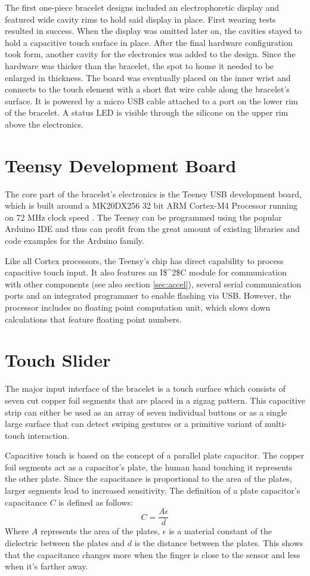 The first one-piece bracelet designs included an electrophoretic display and featured wide cavity rims to hold said display in place. First wearing tests resulted in success. When the display was omitted later on, the cavities stayed to hold a capacitive touch surface in place. After the final hardware configuration took form, another cavity for the electronics was added to the design. Since the hardware was thicker than the bracelet, the spot to house it needed to be enlarged in thickness. The board was eventually placed on the inner wrist and connects to the touch element with a short flat wire cable along the bracelet's surface. It is powered by a micro USB cable attached to a port on the lower rim of the bracelet. A status \ac{LED} is visible through the silicone on the upper rim above the electronics.

\section{Teensy Development Board}
The core part of the bracelet's electronics is the Teensy USB development board, which is built around a MK20DX256 32 bit ARM Cortex-M4 Processor running on 72 MHz clock speed \cite{teensy_web}. The Teensy can be programmed using the popular Arduino IDE and thus can profit from the great amount of existing libraries and code examples for the Arduino family.

Like all Cortex processors, the Teensy's chip has direct capability to process capacitive touch input. It also features an \ac{I$^2$C} module for communication with other components (see also section \ref{sec:accel}), several serial communication ports and an integrated programmer to enable flashing via \ac{USB}. However, the processor includes no floating point computation unit, which slows down calculations that feature floating point numbers. %

\section{Touch Slider}
The major input interface of the bracelet is a touch surface which consists of seven cut copper foil segments that are placed in a zigzag pattern. This capacitive strip can either be used as an array of seven individual buttons or as a single large surface that can detect swiping gestures or a primitive variant of multi-touch interaction.

Capacitive touch is based on the concept of a parallel plate capacitor. The copper foil segments act as a capacitor's plate, the human hand touching it represents the other plate. Since the capacitance is proportional to the area of the plates, larger segments lead to increased sensitivity. The definition of a plate capacitor's capacitance $C$ is defined as follows:
\[
	C = \frac{A\epsilon}{d}
\]
Where $A$ represents the area of the plates, $\epsilon$ is a material constant of the dielectric between the plates and $d$ is the distance between the plates. This shows that the capacitance changes more when the finger is close to the sensor and less when it's farther away.


